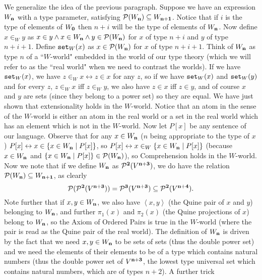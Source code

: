 \documentclass[12pt]{book}
\begin{document}
We generalize the idea of the previous paragraph.  Suppose we have an expression $W_{\bf n}$ with a type parameter,
satisfying ${\cal P}(W_{\bf n}) \subseteq W_{\bf n+1}$.   Notice that if $i$ is the type of elements of $W_{\bf 0}$ then $n+i$ will be the type of
elements of $W_{\bf n}$.  Now define $x \in_W y$ as $x \in y \wedge x \in W_{\bf n} \wedge y \in {\cal P}(W_{\bf n})$ for $x$ of type $n+i$ and
$y$ of type $n+i+1$.  Define ${\tt set}_W(x)$ as $x \in {\cal P}(W_{\bf n})$ for $x$ of type $n+i+1$.  Think of $W_{\bf n}$ as type $n$ of a ``$W$-world" embedded in the world of our type theory (which we will refer to as the ``real world" when we need to contrast the worlds).  If we have ${\tt set}_W(x)$, we have $z \in_W x \leftrightarrow z \in x$ for any $z$, so if we have  ${\tt set}_W(x)$ and ${\tt set}_W(y)$ 
and for every $z$, $z \in_W x$ iff $z \in_W y$, we also have $z \in x$ iff $z \in y$, and of course $x$ and $y$ are sets (since they belong to a power set) so they are equal.  We have just shown that extensionality holds in the $W$-world.  Notice that an atom in the sense of the $W$-world is either an atom in the real world or a set in the real world which has an element which is not in the $W$-world.  Now let $P[x]$ be any sentence of our language.  Observe that for any $x \in W_{\bf n}$ ($n$ being appropriate to the type of $x$) $P[x] \leftrightarrow x \in \{x \in W_{\bf n} \mid P[x]\}$, so $P[x] \leftrightarrow x \in_W \{x \in W_{\bf n} \mid P[x]\}$ (because $x \in W_{\bf n}$ and $\{x \in W_{\bf n} \mid P[x]\} \in {\cal P}(W_{\bf n})$), so Comprehension holds in the $W$-world.  Now we note that if we define $W_{\bf n}$ as ${\cal P}^{\bf 2}(V^{\bf n+3})$, we do have the relation
${\cal P}(W_{\bf n}) \subseteq W_{\bf n+1}$, as clearly $${\cal P}({\cal P}^{\bf 2}(V^{\bf n+3})) = {\cal P}^{\bf 3}(V^{\bf n+3}) \subseteq {\cal P}^{\bf 2}(V^{\bf n+4}).$$  Note further that if $x,y \in W_{\bf n}$, we also have $\left<x,y\right>$ (the Quine pair of $x$ and $y$) belonging to $W_{\bf n}$, and further $\pi_1(x)$ and $\pi_2(x)$ (the Quine projections of $x$) belong to $W_{\bf n}$, so the Axiom of Ordered Pairs is true in the $W$-world (where the pair is read as the Quine pair of the real world).   The definition of $W_{\bf n}$ is driven by the fact that we need $x,y \in W_{\bf n}$ to be sets of sets (thus the double power set) and we need the elements of their elements to be of a type which contains natural numbers (thus the double power set of $V^{\bf n+3}$, the lowest type universal set which contains natural numbers, which are of types $n+2$).   A further trick
\end{document}
